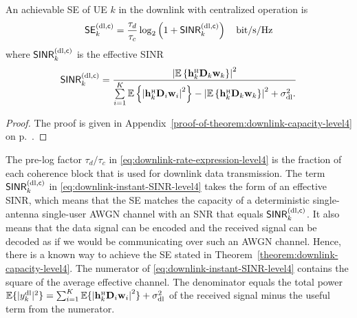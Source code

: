 \begin{theorem} \label{theorem:downlink-capacity-level4}
	An achievable SE of UE $k$ in the downlink with centralized operation is
	\begin{equation} \label{eq:downlink-rate-expression-level4}
	\begin{split}
	\mathsf{SE}_{k}^{({\rm dl},\mathsf{c})} = \frac{\tau_d}{\tau_c} \log_2  \left( 1 + \mathsf{SINR}_{k}^{({\rm dl},\mathsf{c})}  \right) \quad \textrm{bit/s/Hz}
	\end{split}
	\end{equation}
	where $\mathsf{SINR}_{k}^{({\rm dl},\mathsf{c})}$ is the effective SINR
	\begin{equation} \label{eq:downlink-instant-SINR-level4}
	\mathacr{SINR}_{k}^{({\rm dl},\cent)} =  \frac{ \left| \mathbb{E}\left \{ \vect{h}_{k}^{\Htran}\vect{D}_{k}{\vect{w}}_{k}\right \} \right|^2  }{  \sum\limits_{i=1}^{K} \mathbb{E} \left\{ \left|  \vect{h}_{k}^{\Htran} \vect{D}_{i} {\vect{w}}_{i} \right|^2 \right\} -  \left| \mathbb{E} \left\{  \vect{h}_{k}^{\Htran} \vect{D}_{k} {\vect{w}}_{k} \right\} \right|^2 +  \sigmaDL.
	}
	\end{equation}
\end{theorem}
\begin{proof}
The proof is given in Appendix~\ref{proof-of-theorem:downlink-capacity-level4} on p.~\pageref{proof-of-theorem:downlink-capacity-level4}.
\end{proof}

The pre-log factor ${\tau_d}/{\tau_c}$ in \eqref{eq:downlink-rate-expression-level4} is the fraction of each coherence block that is used for downlink data transmission. 
The term $\mathsf{SINR}_{k}^{({\rm dl},\mathsf{c})}$ in \eqref{eq:downlink-instant-SINR-level4} takes the form of an effective SINR, which means that the SE matches the capacity of a deterministic single-antenna single-user AWGN channel with an SNR that equals $\mathsf{SINR}_{k}^{({\rm dl},\mathsf{c})}$. It also means that the data signal can be encoded and the received signal can be decoded as if we would be communicating over such an AWGN channel. Hence, there is a known way to achieve the SE stated in Theorem~\ref{theorem:downlink-capacity-level4}.
The numerator of \eqref{eq:downlink-instant-SINR-level4} contains the square of the average effective channel. The denominator equals the total power  $\mathbb{E}\{ | y_k^{\rm{dl}}|^2\} = \sum_{i=1}^{K} \mathbb{E} \{ \left|  \vect{h}_{k}^{\Htran} \vect{D}_{i} {\vect{w}}_{i} \right|^2 \} +  \sigmaDL$ of the received signal minus the useful term from the numerator.

